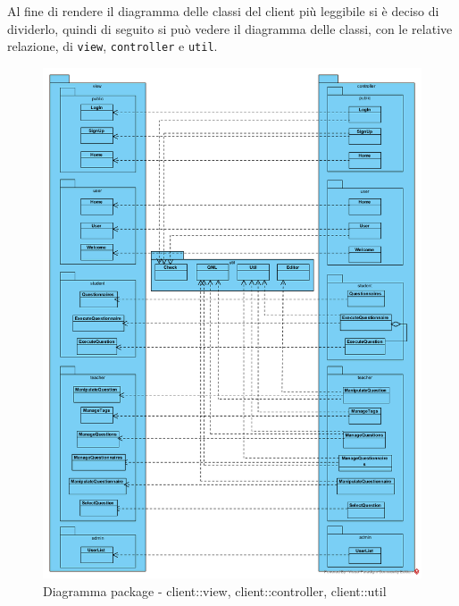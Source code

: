 Al fine di rendere il diagramma delle classi del client più leggibile si è deciso di dividerlo, quindi di seguito si può vedere il diagramma delle classi, con le relative relazione, di \texttt{view}, \texttt{controller} e \texttt{util}.
\begin{center}
	\begin{figure}[H]
		\centering \includegraphics[scale=4, max width=\textwidth, max height=\myheight]{../img/diagrammiClassi/client/viewControllerUtil.png}
		\caption{Diagramma package - client::view, client::controller, client::util}
	\end{figure}
\end{center}

